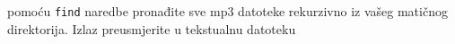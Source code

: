 \documentclass{exam}
\newcommand{\shell}[1]{\texttt{#1}}
\begin{document}
\begin{itemize}
                                                                                                                                                    pomoću
                                                                                                                                                    \shell{find}
                                                                                                                                                    naredbe
                                                                                                                                                    pronađite
                                                                                                                                                    sve
                                                                                                                                                    mp3
                                                                                                                                                    datoteke
                                                                                                                                                    rekurzivno
                                                                                                                                                    iz
                                                                                                                                                    vašeg
                                                                                                                                                    matičnog
                                                                                                                                                    direktorija.
                                                                                                                                                    Izlaz
                                                                                                                                                    preusmjerite
                                                                                                                                                    u
                                                                                                                                                    tekstualnu
                                                                                                                                                    datoteku

\end{itemize}
\end{document}
